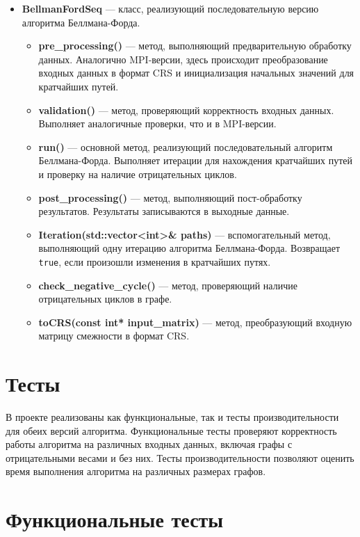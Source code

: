 \documentclass[12pt]{article}
\begin{document}
\begin{itemize}
    \item \textbf{BellmanFordSeq} — класс, реализующий последовательную версию алгоритма Беллмана-Форда.
    \begin{itemize}
        \item \textbf{pre\_processing()} — метод, выполняющий предварительную обработку данных. Аналогично MPI-версии, здесь происходит преобразование входных данных в формат CRS и инициализация начальных значений для кратчайших путей.
        \item \textbf{validation()} — метод, проверяющий корректность входных данных. Выполняет аналогичные проверки, что и в MPI-версии.
        \item \textbf{run()} — основной метод, реализующий последовательный алгоритм Беллмана-Форда. Выполняет итерации для нахождения кратчайших путей и проверку на наличие отрицательных циклов.
        \item \textbf{post\_processing()} — метод, выполняющий пост-обработку результатов. Результаты записываются в выходные данные.
        \item \textbf{Iteration(std::vector<int>\& paths)} — вспомогательный метод, выполняющий одну итерацию алгоритма Беллмана-Форда. Возвращает \texttt{true}, если произошли изменения в кратчайших путях.
        \item \textbf{check\_negative\_cycle()} — метод, проверяющий наличие отрицательных циклов в графе.
        \item \textbf{toCRS(const int* input\_matrix)} — метод, преобразующий входную матрицу смежности в формат CRS.
    \end{itemize}
\end{itemize}

\section*{Тесты}

В проекте реализованы как функциональные, так и тесты производительности для обеих версий алгоритма. Функциональные тесты проверяют корректность работы алгоритма на различных входных данных, включая графы с отрицательными весами и без них. Тесты производительности позволяют оценить время выполнения алгоритма на различных размерах графов.

\section*{Функциональные тесты}
\end{document}
